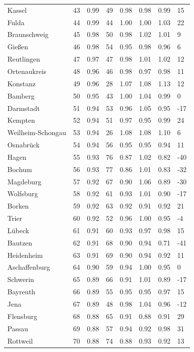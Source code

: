 \documentclass[11pt,a4paper]{article}
\begin{document}
{\begin{longtable}{llllllll}
Kassel & 43 & 0.99 & 49 & 0.98 & 0.98 & 0.99 & 15 \\
Fulda & 44 & 0.99 & 44 & 1.00 & 1.00 & 1.03 & 22 \\
Braunschweig & 45 & 0.98 & 50 & 0.98 & 1.02 & 1.01 & 9 \\
Gießen & 46 & 0.98 & 54 & 0.95 & 0.98 & 0.96 & 6 \\
Reutlingen & 47 & 0.97 & 47 & 0.98 & 1.01 & 1.02 & 12 \\
Ortenaukreis & 48 & 0.96 & 46 & 0.98 & 0.97 & 0.98 & 11 \\
Konstanz & 49 & 0.96 & 28 & 1.07 & 1.08 & 1.13 & 12 \\
Bamberg & 50 & 0.95 & 43 & 1.00 & 1.04 & 0.99 & 0 \\
Darmstadt & 51 & 0.94 & 53 & 0.96 & 1.05 & 0.95 & -17 \\
Kempten & 52 & 0.94 & 51 & 0.97 & 0.95 & 0.99 & 24 \\
Weilheim-Schongau & 53 & 0.94 & 26 & 1.08 & 1.08 & 1.10 & 6 \\
Osnabrück & 54 & 0.94 & 56 & 0.95 & 0.95 & 0.94 & 11 \\
Hagen & 55 & 0.93 & 76 & 0.87 & 1.02 & 0.82 & -40 \\
Bochum & 56 & 0.93 & 77 & 0.86 & 1.01 & 0.83 & -32 \\
Magdeburg & 57 & 0.92 & 67 & 0.90 & 1.06 & 0.89 & -30 \\
Wolfsburg & 58 & 0.92 & 61 & 0.93 & 1.01 & 0.90 & -17 \\
Borken & 59 & 0.92 & 63 & 0.92 & 0.91 & 0.92 & 21 \\
Trier & 60 & 0.92 & 52 & 0.96 & 1.00 & 0.95 & -4 \\
Lübeck & 61 & 0.91 & 60 & 0.93 & 0.97 & 0.98 & 15 \\
Bautzen & 62 & 0.91 & 68 & 0.90 & 0.94 & 0.71 & -41 \\
Heidenheim & 63 & 0.91 & 69 & 0.90 & 0.94 & 0.92 & 11 \\
Aschaffenburg & 64 & 0.90 & 59 & 0.94 & 1.00 & 0.95 & 0 \\
Schwerin & 65 & 0.89 & 66 & 0.91 & 1.01 & 0.89 & -17 \\
Bayreuth & 66 & 0.89 & 55 & 0.95 & 0.95 & 0.97 & 15 \\
Jena & 67 & 0.89 & 48 & 0.98 & 1.04 & 0.96 & -12 \\
Flensburg & 68 & 0.88 & 65 & 0.91 & 0.88 & 0.91 & 29 \\
Passau & 69 & 0.88 & 57 & 0.94 & 0.92 & 0.98 & 31 \\
Rottweil & 70 & 0.88 & 74 & 0.88 & 0.93 & 0.92 & 13 \\

\end{longtable}}
\end{document}
